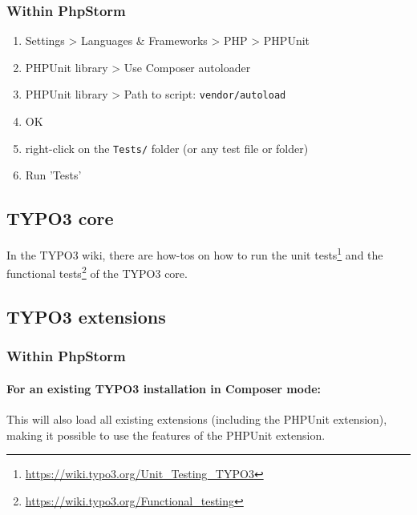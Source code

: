\documentclass[a4paper,11pt,headsepline]{scrartcl}
\begin{document}
\subsubsection{Within PhpStorm}
\begin{enumerate}
  \item Settings > Languages \& Frameworks > PHP > PHPUnit
  \item PHPUnit library > Use Composer autoloader
  \item PHPUnit library > Path to script: \texttt{vendor/autoload}
  \item OK
  \item right-click on the \texttt{Tests/} folder (or any test file or folder)
  \item Run 'Tests'
\end{enumerate}


\subsection{TYPO3 core}

In the TYPO3 wiki, there are how-tos on how to run the unit tests\footnote{\url{https://wiki.typo3.org/Unit_Testing_TYPO3}} and the functional tests\footnote{\url{https://wiki.typo3.org/Functional_testing}} of the TYPO3 core.


\subsection{TYPO3 extensions}

\subsubsection{Within PhpStorm}

\paragraph{For an existing TYPO3 installation in Composer mode:}

This will also load all existing extensions (including the PHPUnit extension), making it possible to use the features of the PHPUnit extension.
\end{document}
